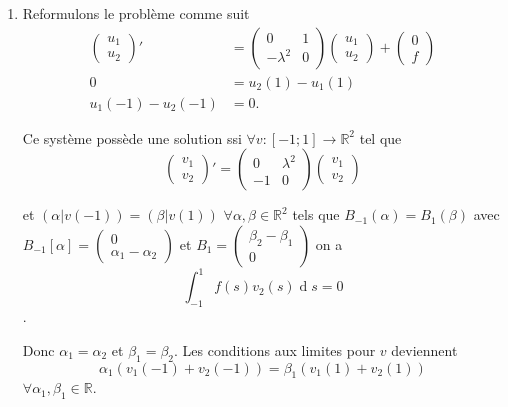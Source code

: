 \documentclass{article}
\DeclareMathOperator{\newdiff}{d} %
\newcommand{\dif}{\newdiff\!}
\begin{document}
\begin{enumerate}
  \item
    Reformulons le problème comme suit
    \begin{align*}
    \begin{pmatrix}
      u_1\\u_2
    \end{pmatrix}' & =
    \begin{pmatrix}
      0 & 1\\-\lambda^2 & 0
    \end{pmatrix}
    \begin{pmatrix}
      u_1\\u_2
    \end{pmatrix}
    +
    \begin{pmatrix}
      0\\f
    \end{pmatrix}\\
    0 & =  u_2(1) - u_1(1)\\
    u_1(-1) - u_2(-1) & = 0.
    \end{align*}

    Ce système possède une solution
    ssi $\forall v: [-1;1] \to \mathbb{R}^2$ tel que
    \[\begin{pmatrix}
      v_1\\v_2
    \end{pmatrix}' =
    \begin{pmatrix}
      0 & \lambda^2\\-1 & 0
    \end{pmatrix}
    \begin{pmatrix}v_1\\v_2
    \end{pmatrix}\]

    et $(\alpha|v(-1)) = (\beta|v(1))$ $\forall \alpha,\beta \in\mathbb{R}^2$
    tels que $B_{-1}(\alpha) = B_1(\beta)$
    avec $B_{-1}[\alpha] =
    \begin{pmatrix}
      0\\\alpha_1-\alpha_2
    \end{pmatrix}$ et
    $B_1 =
    \begin{pmatrix}
      \beta_2-\beta_1\\0
    \end{pmatrix}$
    on a
    \[ \int_{-1}^1 f(s)v_2(s) \dif s = 0 \].


    Donc $\alpha_1 = \alpha_2$ et $\beta_1 = \beta_2$.
    Les conditions aux limites pour $v$ deviennent
    \[\alpha_1(v_1(-1) + v_2(-1)) = \beta_1(v_1(1) + v_2(1))\]
    $\forall \alpha_1,\beta_1 \in\mathbb{R}$.


\end{enumerate}
\end{document}
